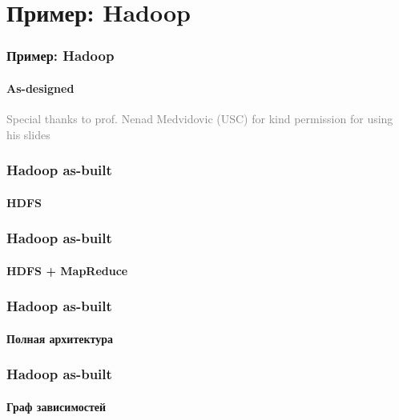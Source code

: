 \documentclass{../mcsslides}
\begin{document}
    \section{Пример: Hadoop}

    \begin{frame}
        \frametitle{Пример: Hadoop}
        \framesubtitle{As-designed}
        \begin{scriptsize}\textcolor{gray}{Special thanks to prof. Nenad Medvidovic (USC) for kind permission for using his slides}\end{scriptsize}
    \end{frame}

    \begin{frame}
        \frametitle{Hadoop as-built}
        \framesubtitle{HDFS}
    \end{frame}

    \begin{frame}
        \frametitle{Hadoop as-built}
        \framesubtitle{HDFS + MapReduce}
    \end{frame}

    \begin{frame}
        \frametitle{Hadoop as-built}
        \framesubtitle{Полная архитектура}
    \end{frame}

    \begin{frame}
        \frametitle{Hadoop as-built}
        \framesubtitle{Граф зависимостей}
    \end{frame}
\end{document}
